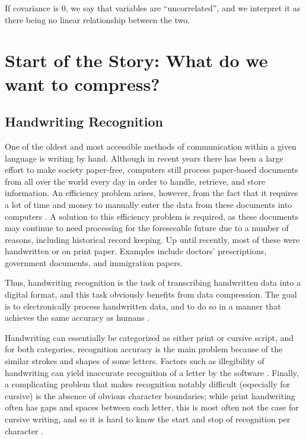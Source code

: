 \documentclass[12pt]{report}
\begin{document}
                If covariance is 0, we say that variables are ``uncorrelated'', and we interpret it as there being no linear relationship between the two.
    
    \chapter{Start of the Story: What do we want to compress?}
        \section{Handwriting Recognition}
            
            One of the oldest and most accessible methods of communication within a given language is writing by hand. Although in recent years there has been a large effort to make society paper-free, computers still process paper-based documents from all over the world every day in order to handle, retrieve, and store information. An efficiency problem arises, however, from the fact that it requires a lot of time and money to manually enter the data from these documents into computers \cite{Bortolozzi2005}. A solution to this efficiency problem is required, as these documents may continue to need processing for the foreseeable future due to a number of reasons, including historical record keeping. Up until recently, most of these were handwritten or on print paper. Examples include doctors' prescriptions, government documents, and immigration papers.
        
            Thus, handwriting recognition is the task of transcribing handwritten data into a digital format, and this task obviously benefits from data compression. The goal is to electronically process handwritten data, and to do so in a manner that achieves the same accuracy as humans \cite{Gunter2005}.
            
            Handwriting can essentially be categorized as either print or cursive script, and for both categories, recognition accuracy is the main problem because of the similar strokes and shapes of some letters. Factors such as illegibility of handwriting can yield inaccurate recognition of a letter by the software \cite{Holzinger2012}. Finally, a complicating problem that makes recognition notably difficult (especially for cursive) is the absence of obvious character boundaries; while print handwriting often has gaps and spaces between each letter, this is most often not the case for cursive writing, and so it is hard to know the start and stop of recognition per character \cite{Puigcerver2017}.
            
\end{document}
